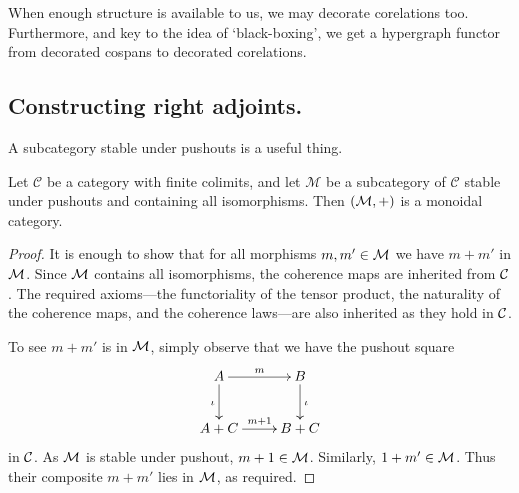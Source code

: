 When enough structure is available to us, we may decorate corelations too.
Furthermore, and key to the idea of `black-boxing', we get a hypergraph functor
from decorated cospans to decorated corelations.


\subsection{Constructing right adjoints.}
A subcategory stable under pushouts is a useful thing.

\begin{lemma}
  Let $\mathcal C$ be a category with finite colimits, and let $\mathcal M$ be a
  subcategory of $\mathcal C$ stable under pushouts and containing all
  isomorphisms. Then $(\mathcal M,+)$ is a monoidal category.
\end{lemma}
\begin{proof}
  It is enough to show that for all morphisms $m,m' \in \mathcal M$ we have $m+m'$ in
  $\mathcal M$. Since $\mathcal M$ contains all isomorphisms, the coherence maps are
  inherited from $\mathcal C$. The required axioms---the functoriality of the tensor
  product, the naturality of the coherence maps, and the coherence laws---are
  also inherited as they hold in $\mathcal C$.

  To see $m+m'$ is in $\mathcal M$, simply observe that we have the pushout square
  \[
    \xymatrix{
      A \ar[r]^m \ar[d]_{\iota} & B \ar[d]^{\iota} \\
      A+C \ar[r]^{m+1} & B+C
    }
  \]
  in $\mathcal C$. As $\mathcal M$ is stable under pushout, $m+1 \in \mathcal M$. Similarly,
  $1+m' \in \mathcal M$. Thus their composite $m+m'$ lies in $\mathcal M$, as required.
\end{proof}

